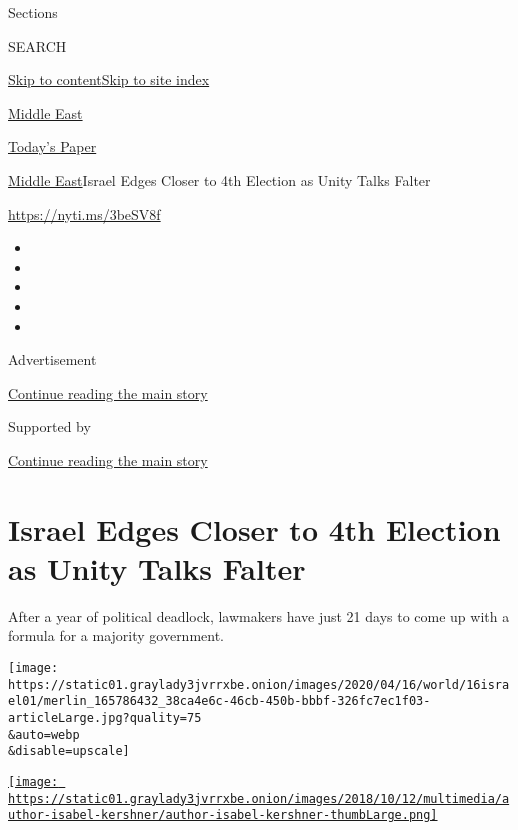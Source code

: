 Sections

SEARCH

\protect\hyperlink{site-content}{Skip to
content}\protect\hyperlink{site-index}{Skip to site index}

\href{https://www.nytimes3xbfgragh.onion/section/world/middleeast}{Middle
East}

\href{https://myaccount.nytimes3xbfgragh.onion/auth/login?response_type=cookie\&client_id=vi}{}

\href{https://www.nytimes3xbfgragh.onion/section/todayspaper}{Today's
Paper}

\href{/section/world/middleeast}{Middle East}\textbar{}Israel Edges
Closer to 4th Election as Unity Talks Falter

\url{https://nyti.ms/3beSV8f}

\begin{itemize}
\item
\item
\item
\item
\item
\end{itemize}

Advertisement

\protect\hyperlink{after-top}{Continue reading the main story}

Supported by

\protect\hyperlink{after-sponsor}{Continue reading the main story}

\hypertarget{israel-edges-closer-to-4th-election-as-unity-talks-falter}{%
\section{Israel Edges Closer to 4th Election as Unity Talks
Falter}\label{israel-edges-closer-to-4th-election-as-unity-talks-falter}}

After a year of political deadlock, lawmakers have just 21 days to come
up with a formula for a majority government.

\texttt{[image: https://static01.graylady3jvrrxbe.onion/images/2020/04/16/world/16israel01/merlin\_165786432\_38ca4e6c-46cb-450b-bbbf-326fc7ec1f03-articleLarge.jpg?quality=75\\\&auto=webp\\\&disable=upscale]}

\href{https://www.nytimes3xbfgragh.onion/by/isabel-kershner}{\texttt{[image: https://static01.graylady3jvrrxbe.onion/images/2018/10/12/multimedia/author-isabel-kershner/author-isabel-kershner-thumbLarge.png]}}

